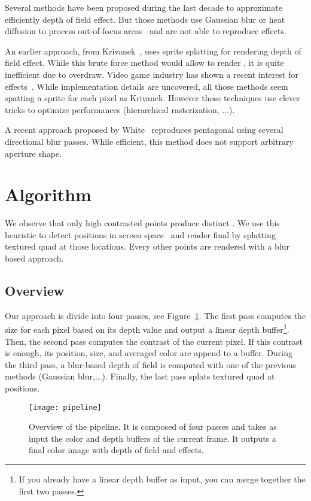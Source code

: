 Several methods have been proposed during the last decade to approximate efficiently depth of field effect. But those methods use Gaussian blur or heat diffusion to process out-of-focus areas~\cite{Hammon07,Kosloff07} and are not able to reproduce \bokeh effects.

An earlier approach, from Krivanek~\cite{Krivanek03}, uses sprite splatting for rendering depth of field effect. While this brute force method would allow to render \bokehs, it is quite inefficient due to overdraw. Video game industry has shown a recent interest for \bokeh effects~\cite{Sousa11,Futurmark11,Mittring11}. While implementation details are uncovered, all those methods seem spatting a sprite for each pixel as Krivanek. However those techniques use clever tricks to optimize performances (hierarchical rasterization, ...). 

A recent approach proposed by White~\cite{White11} reproduces pentagonal \bokeh using several directional blur passes. While efficient, this method does not support arbitrary aperture shape.

\section{Algorithm}
We observe that only high contrasted points produce distinct \bokehs. We use this heuristic to detect \bokeh positions in screen space~\cite{Pettineo11} and render final \bokehs by splatting textured quad at those locations. Every other points are rendered with a blur based approach.

\subsection{Overview}
Our approach is divide into four passes, see Figure~\ref{DeRousiers:pipeline}. The first pass computes the \coc size for each pixel based on its depth value and output a linear depth buffer\footnote{If you already have a linear depth buffer as input, you can merge together the first two passes.}. Then, the second pass computes the contrast of the current pixel. If this contrast is enough, its position, \coc size, and averaged color are append to a buffer. During the third pass, a blur-based depth of field is computed with one of the previous methods (Gaussian blur,...). Finally, the last pass splats textured quad at \bokeh positions.

	\begin{figure}[htb]\centering
	\texttt{[image: pipeline]}
	\caption{Overview of the pipeline. It is composed of four passes and takes as input the color and depth buffers of the current frame. It outputs a final color image with depth of field and \bokeh effects.}
	\label{DeRousiers:pipeline}
	\end{figure}

